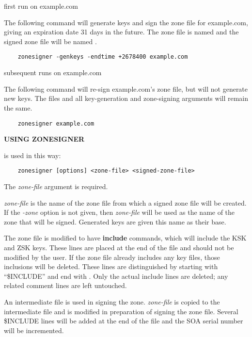 \begin{description}

\item first run on example.com\verb" "

The following command will generate keys and sign the zone file for
example.com, giving an expiration date 31 days in the future.  The
zone file is named  and the signed zone file will be
named .

\begin{verbatim}
    zonesigner -genkeys -endtime +2678400 example.com
\end{verbatim}

\item subsequent runs on example.com\verb" "

The following command will re-sign example.com's zone file, but will not
generate new keys.  The files and all key-generation and zone-signing
arguments will remain the same.

\begin{verbatim}
    zonesigner example.com
\end{verbatim}

\end{description}

{\bf USING ZONESIGNER}

 is used in this way:

\begin{verbatim}
    zonesigner [options] <zone-file> <signed-zone-file>
\end{verbatim}

The {\it zone-file} argument is required.

{\it zone-file} is the name of the zone file from which a signed zone file
will be created.  If the {\it -zone} option is not given, then {\it zone-file}
will be used as the name of the zone that will be signed.  Generated keys are
given this name as their base.

The zone file is modified to have {\bf include} commands, which will include
the KSK and ZSK keys.  These lines are placed at the end of the file and
should not be modified by the user.  If the zone file already includes any key
files, those inclusions will be deleted.  These lines are distinguished by
starting with ``\$INCLUDE'' and end with .  Only the actual include
lines are deleted; any related comment lines are left untouched.

An intermediate file is used in signing the zone.  {\it zone-file} is copied
to the intermediate file and is modified in preparation of signing the zone
file.  Several \$INCLUDE lines will be added at the end of the file and the
SOA serial number will be incremented.

